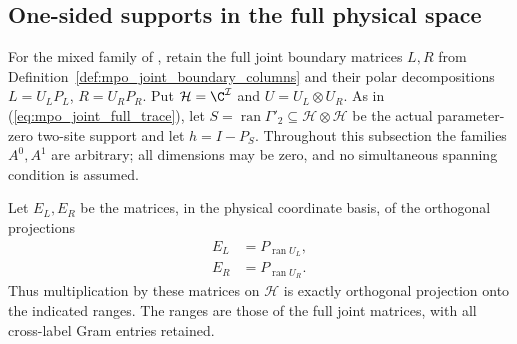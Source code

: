 
\subsection{One-sided supports in the full physical space}
\label{sec:mpo_joint_one_sided_support}

For the mixed family of \cite[Section~5]{GarreRubio2023MPOSym}, retain
the full joint boundary matrices $L,R$ from
Definition~\ref{def:mpo_joint_boundary_columns} and their polar
decompositions $L=U_LP_L$, $R=U_RP_R$. Put
$\mathcal H=\C^{\mathcal I}$ and $U=U_L\otimes U_R$.
As in (\ref{eq:mpo_joint_full_trace}), let
$S=\operatorname{ran}\Gamma'_2\subseteq\mathcal H\otimes\mathcal H$
be the actual parameter-zero two-site support and let $h=I-P_S$.
Throughout this subsection the families $A^0,A^1$ are arbitrary;
all dimensions may be zero, and no simultaneous spanning condition is
assumed.

\begin{definition}
    \label{def:mpo_joint_frame_range_projections}
    Let $E_L,E_R$ be the matrices, in the physical coordinate basis,
    of the orthogonal projections
    \begin{align}
        E_L & =P_{\operatorname{ran}U_L}, \\
        E_R & =P_{\operatorname{ran}U_R}.
    \end{align}
    Thus multiplication by these matrices on $\mathcal H$ is exactly
    orthogonal projection onto the indicated ranges. The ranges are
    those of the full joint matrices, with all cross-label Gram entries
    retained.
\end{definition}

